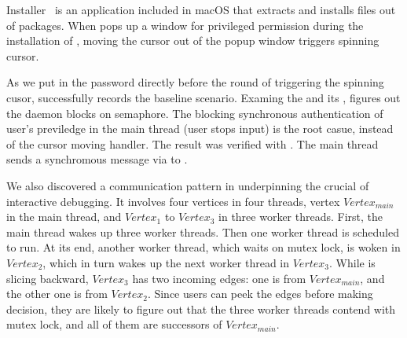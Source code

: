 Installer~\cite{Installer} is an application included in macOS that extracts and installs
files out of  packages. When  pops up a window for
privileged permission during the installation of ,
moving the cursor out of the popup window triggers spinning cursor.

As we put in the password directly before the round of triggering the
spinning cusor, \xxx successfully records the baseline scenario. Examing
the \spinningnode and its \similarnode, \xxx figures out the daemon
 blocks on semaphore. The blocking synchronous authentication
of user's previledge in the main thread (user stops input) is the root
casue, instead of the cursor moving handler. The result was verified with
. The main thread sends a synchromous message via  to .


We also discovered a communication pattern in  underpinning the
crucial of interactive debugging. It involves four vertices in four threads,
vertex $Vertex_{main}$ in the main thread, and $Vertex_1$ to $Vertex_3$ in
three worker threads. First, the main thread wakes up three worker threads.
Then one worker thread is scheduled to run. At its end, another worker thread,
which waits on mutex lock, is woken in $Vertex_2$, which in turn wakes up the
next worker thread in $Vertex_3$. While \xxx is slicing backward, $Vertex_3$
has two incoming edges: one is from $Vertex_{main}$, and the other one is from
$Vertex_2$. Since users can peek the edges before making decision, they are
likely to figure out that the three worker threads contend with mutex lock, and
all of them are successors of $Vertex_{main}$.
